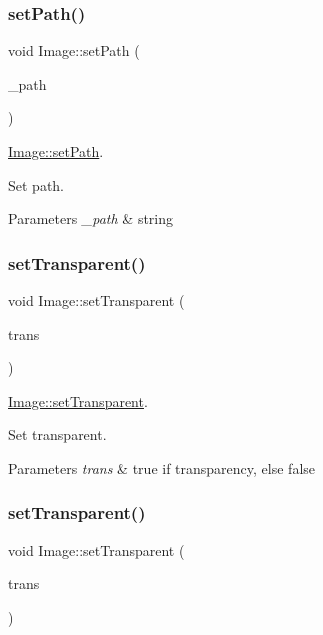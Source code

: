 \subsubsection{\texorpdfstring{setPath()}{setPath()}}
{\footnotesize\ttfamily void Image\+::set\+Path (\begin{DoxyParamCaption}\item[{Q\+String}]{\+\_\+path }\end{DoxyParamCaption})}



\mbox{\hyperlink{class_image_a00270889235de4a75a620c94e7b56682}{Image\+::set\+Path}}. 

Set path. 
\begin{DoxyParams}{Parameters}
{\em \+\_\+path} & string \\
\hline
\end{DoxyParams}
\mbox{\label{class_image_a52e45825bdd0de9b53c36b1a80936cca}} 
\subsubsection{\texorpdfstring{setTransparent()}{setTransparent()}\hspace{0.1cm}{\footnotesize\ttfamily [1/2]}}
{\footnotesize\ttfamily void Image\+::set\+Transparent (\begin{DoxyParamCaption}\item[{bool}]{trans }\end{DoxyParamCaption})}



\mbox{\hyperlink{class_image_a52e45825bdd0de9b53c36b1a80936cca}{Image\+::set\+Transparent}}. 

Set transparent. 
\begin{DoxyParams}{Parameters}
{\em trans} & true if transparency, else false \\
\hline
\end{DoxyParams}
\mbox{\label{class_image_aa33101892a02308ad3de2f7eaf22a7a5}} 
\subsubsection{\texorpdfstring{setTransparent()}{setTransparent()}\hspace{0.1cm}{\footnotesize\ttfamily [2/2]}}
{\footnotesize\ttfamily void Image\+::set\+Transparent (\begin{DoxyParamCaption}\item[{int}]{trans }\end{DoxyParamCaption})}



